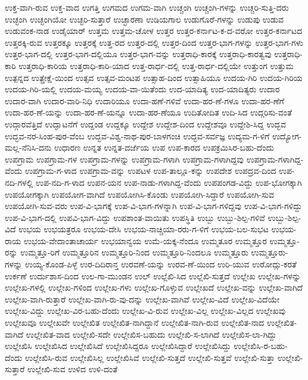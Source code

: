 {ಉಕ್ತ-ವಾಗಿ-ರುವ
ಉಕ್ತ-ವಾದ
ಉಗತ್ತಿ
ಉಗಮದ
ಉಗಮ-ವಾಗಿ
ಉಚ್ಚಂಗಿ
ಉಚ್ಚಂಗಿ-ಗಳನ್ನು
ಉಚ್ಚರಿ-ಸುತ್ತಿ-ದರು
ಉಚ್ಛಂಗಿ
ಉಚ್ಛಂಗಿಯೋ
ಉಚ್ಛರಿ-ಸುತ್ತಾರೆ
ಉಚ್ಛಾರಣಾ
ಉಡಿಯಗಾಲ
ಉಡುಗೊರೆ-ಗಳನ್ನು
ಉಡುಪು
ಉಡುವ
ಉಡುವಂಕ-ನಾಡ
ಉಡೈಯಾರ್
ಉತ್ತಮ
ಉತ್ತಮ-ಚೋಳ
ಉತ್ತರ
ಉತ್ತರ-ಕರ್ನಾಟ-ಕ-ದ-ವರೋ
ಉತ್ತರ-ಕರ್ನಾಟದ
ಉತ್ತರಕ್ಕಿ-ರುವ
ಉತ್ತರಕ್ಕೂ
ಉತ್ತರಕ್ಕೆ
ಉತ್ತ-ರದ
ಉತ್ತರ-ದಲ್ಲಿ
ಉತ್ತರ-ದಿಂದ
ಉತ್ತರ-ಭಾಗ-ಗಳನ್ನು
ಉತ್ತರ-ಭಾಗ-ಗಳು
ಉತ್ತರ-ಭಾಗ-ದಲ್ಲಿ
ಉತ್ತರ-ಭಾಗ-ದಲ್ಲಿಯೂ
ಉತ್ತರ-ಭಾಗ-ವನ್ನು
ಉತ್ತರಾಧಿ-ಕಾರಕ್ಕೆ
ಉತ್ತರಾಧಿ-ಕಾರತ್ವವು
ಉತ್ತರಾಧಿ-ಕಾರಿ
ಉತ್ತರಾಧಿ-ಕಾರಿಯ
ಉತ್ತರಾಧಿ-ಕಾರಿ-ಯಾದ
ಉತ್ತ-ರಾರ್ಧ-ದಲ್ಲಿ
ಉತ್ತ-ರಾರ್ಧ-ದಲ್ಲಿಯೇ
ಉತ್ತುಂಗ
ಉತ್ತುಮ
ಉತ್ಪನ್ನದ
ಉತ್ಪ್ರೇಕ್ಷೆ-ಯಿಂದ
ಉತ್ಸವ
ಉತ್ಸವ-ಮಂಟಪ
ಉತ್ಸಾಹ-ದಿಂದ
ಉತ್ಸಾಹಿಯೂ
ಉದಯ-ಗಿರಿ
ಉದಯ-ಗಿರಿಯ
ಉದಯ-ಗಿರಿ-ಯಲ್ಲಿ
ಉದಯ-ಮಯ್ಯ
ಉದಯ-ವಾ-ಯಿತೆಂದು
ಉದ-ಯಾದಿತ್ಯ
ಉದ-ಯಾದಿತ್ಯರು
ಉದಾರ
ಉದಾರ-ವಾಗಿ
ಉದಾರ-ವಾರಿ-ನಿಧಿ
ಉದಾರಿಯೂ
ಉದಾ-ಹಣೆ-ಗಳಿವೆ
ಉದಾ-ಹರ-ಣೆ-ಗಳೂ
ಉದಾ-ಹರ-ಣೆಗೆ
ಉದಾ-ಹರ-ಣೆ-ಯನ್ನು
ಉದಾ-ಹರ-ಣೆ-ಯನ್ನೂ
ಉದಾ-ಹರ-ಣೆಯೂ
ಉದಿತೋದಿತ
ಉದಿ-ಸಿದ
ಉದ್ಗರಿಸು-ವಂತೆ
ಉದ್ಗಾರವೆತ್ತಿದೆ
ಉದ್ಘಾಟನೆಗೆ
ಉದ್ದಂಡ
ಉದ್ದಕ್ಕೂ
ಉದ್ದೇಶ
ಉದ್ದೇಶ-ದಿಂದ
ಉದ್ದೇಶವೂ
ಉದ್ದೇಶಿ-ಸಿದ್ದ
ಉದ್ಭವ
ಉದ್ಭವ-ನರ-ಸಿಂಹ-ಪುರ-ವೆಂಬ
ಉದ್ಭವ-ವಿಶ್ವ-ನಾಥ-ಪುರ-ಬಾಳಗಂಚಿ
ಉದ್ಭವ-ಸರ್ವಜ್ಞ
ಉದ್ಯಮ-ಗ-ಳಿಗೆ
ಉದ್ಯೋಗ-ಮಲ್ಲ-ನೆನಿಸಿ-ದನು
ಉಧಾರಣ
ಉನ್ನತ
ಉನ್ನತ-ದರ್ಜೆಯ
ಉಪ
ಉಪ-ಕಾರದ
ಉಪಕ್ರಮಿಸಿರ-ಬಹು-ದೆಂದು
ಉಪಗ್ರಾಮ
ಉಪಗ್ರಾಮ-ಗಳ
ಉಪಗ್ರಾಮ-ಗಳನ್ನು
ಉಪಗ್ರಾಮ-ಗಳಾಗಿ
ಉಪಗ್ರಾಮ-ಗಳಾಗಿದ್ದವು
ಉಪಗ್ರಾಮ-ಗಳಾಗಿದ್ದ-ವೆಂದು
ಉಪಗ್ರಾಮ-ಗ-ಳಾದ
ಉಪಗ್ರಾಮ-ವನ್ನು
ಉಪಟಳ
ಉಪ-ತಾಲ್ಲೂ-ಕನ್ನು
ಉಪದೇಶ
ಉಪದ್ರವ-ದಿಂದ
ಉಪ-ನದಿ-ಗಳಲ್ಲಿ
ಉಪ-ನದಿ-ಗ-ಳಾದ
ಉಪನ-ಯನ
ಉಪ-ನಾಡು-ಗಳಾಗಿದ್ದ-ವೆಂದು
ಉಪಪಂಗಡ-ವಿದ್ದು
ಉಪ-ಭೋಗಕ್ಕಾಗಿ
ಉಪಯೋಗಕ್ಕಾಗಿ
ಉಪಯೋಗ-ವಾಗಿದೆ
ಉಪಯೋಗಿಸಿ-ಕೊಂಡು
ಉಪಯೋಗಿ-ಸಿದ್ದಾರೆ
ಉಪಯೋಗಿ-ಸುವ
ಉಪಯೋಗಿ-ಸುವ-ವರು
ಉಪ-ವಿ-ಭಾಗಕ್ಕೆ
ಉಪ-ವಿ-ಭಾಗ-ಗಳನ್ನಾಗಿ
ಉಪ-ವಿ-ಭಾಗ-ಗಳಿದ್ದವು
ಉಪ-ವಿ-ಭಾಗ-ಗಳಿದ್ದು
ಉಪ-ವಿ-ಭಾಗ-ದಲ್ಲಿ
ಉಪವಿ-ಭಾಗ-ವಿದ್ದು
ಉಪಶಾಂತ-ವಾಯಿತು
ಉಪಸ್ಥಿತಿ
ಉಬ್ಬು
ಉಬ್ಬು-ಶಿಲ್ಪ-ಗಳಿವೆ
ಉಬ್ಬು-ಶಿಲ್ಪ-ವಿದೆ
ಉಭಯ
ಉಭಯತ್ರರೂ
ಉಭಯ-ದೇಸಿ
ಉಭಯ-ನಾಚ್ಚಿಯಾ-ರರು-ಗ-ಳಿಗೆ
ಉಭಯ-ಬಲ-ಸುಭಟ
ಉಭಯ-ರಾಯ
ಉಭಯ-ವೇದಾಂತಾಚಾರ್ಯ
ಉಭಯಾನ್ವಯ
ಉಮೆ-ಯಕ್ಕ-ನೆಂದೂ
ಉಮ್ಮತೂರ
ಉಮ್ಮತ್ತೂರ
ಉಮ್ಮತ್ತೂ-ರನ್ನು
ಉಮ್ಮತ್ತೂ-ರಿಗೆ
ಉಮ್ಮತ್ತೂರಿನ
ಉಮ್ಮತ್ತೂರಿ-ನಿಂದ
ಉಮ್ಮತ್ತೂರಿ-ನಿಂದಲೂ
ಉಮ್ಮತ್ತೂರು
ಉಮ್ಮತ್ತೂರು-ಗಳನ್ನು
ಉಯ್ಯ-ಕೊಂಡ-ಪಿಳ್ಳೆ
ಉರ-ದಿದಿರಾನ್ತ
ಉರವಣೆ-ಯನ್ನು
ಉರವ-ಣೆ-ಯಿಂದ
ಉರಿ-ಯುವ
ಉರೋದ್ಗು-ಕರತೆ
ಉರ್ಕಣೆ
ಉರ್ದುಶಾಸ-ದಿಂದ
ಉಲ-ಗಾ-ಮುಂಡನ
ಉಲ್
ಉಲ್ಲೆಖಿ-ಸಿದ
ಉಲ್ಲೆಖಿ-ಸುತ್ತದೆ
ಉಲ್ಲೇಖ
ಉಲ್ಲೇಖ-ಗಳನ್ನು
ಉಲ್ಲೇಖ-ಗಳಲ್ಲಿ
ಉಲ್ಲೇಖ-ಗಳಿಂದ
ಉಲ್ಲೇಖ-ಗಳು
ಉಲ್ಲೇಖ-ಗೊಳ್ಳುವ
ಉಲ್ಲೇಖದೆ
ಉಲ್ಲೇಖ-ವನ್ನು
ಉಲ್ಲೇಖ-ವಾಗಿದೆ
ಉಲ್ಲೇಖ-ವಾಗಿ-ರುತ್ತಾರೆ
ಉಲ್ಲೇಖ-ವಾಗಿ-ರು-ವು-ದನ್ನು
ಉಲ್ಲೇಖ-ವಾಗಿವೆ
ಉಲ್ಲೇಖ-ವಿದೆ
ಉಲ್ಲೇಖ-ವಿದೆಯೇ
ಉಲ್ಲೇಖ-ವಿದ್ದು
ಉಲ್ಲೇಖ-ವಿರ-ಬಹು-ದೆಂದು
ಉಲ್ಲೇಖ-ವಿ-ರುವ
ಉಲ್ಲೇಖ-ವಿಲ್ಲ
ಉಲ್ಲೇಖ-ವಿಲ್ಲದ
ಉಲ್ಲೇಖವು
ಉಲ್ಲೇಖವೂ
ಉಲ್ಲೇಖವೇ
ಉಲ್ಲೇಖಿತ
ಉಲ್ಲೇಖಿತ-ನಾಗಿದ್ದಾನೆ
ಉಲ್ಲೇಖಿತ-ನಾಗಿ-ರುವ
ಉಲ್ಲೇಖಿತ-ನಾದ
ಉಲ್ಲೇಖಿತ-ವಾಗಿದೆ
ಉಲ್ಲೇಖಿತ-ವಾದ
ಉಲ್ಲೇಖಿ-ಸದೇ
ಉಲ್ಲೇಖಿಸ-ಬಹುದು
ಉಲ್ಲೇಖಿ-ಸ-ಲಾಗಿದೆ
ಉಲ್ಲೇಖಿಸ-ಲಾ-ಗಿದ್ದು
ಉಲ್ಲೇಖಿಸಿ
ಉಲ್ಲೇಖಿಸಿದ
ಉಲ್ಲೇಖಿಸಿದೆ
ಉಲ್ಲೇಖಿಸಿದ್ದರೂ
ಉಲ್ಲೇಖಿಸಿದ್ದಾರೆ
ಉಲ್ಲೇಖಿಸಿದ್ದು
ಉಲ್ಲೇಖಿಸಿ-ರ-ಬಹು-ದೆಂದು
ಉಲ್ಲೇಖಿಸಿ-ರುವ
ಉಲ್ಲೇಖಿಸಿಲ್ಲ
ಉಲ್ಲೇಖಿಸಿವೆ
ಉಲ್ಲೇಖಿ-ಸುತ್ತದೆ
ಉಲ್ಲೇಖಿ-ಸುತ್ತವೆ
ಉಲ್ಲೇಖಿ-ಸುತ್ತಾ
ಉಲ್ಲೇಖಿ-ಸುತ್ತಾರೆ
ಉಲ್ಲೇಖಿ-ಸುವ
ಉಳಿದ
ಉಳಿ-ದಂತೆ
}

